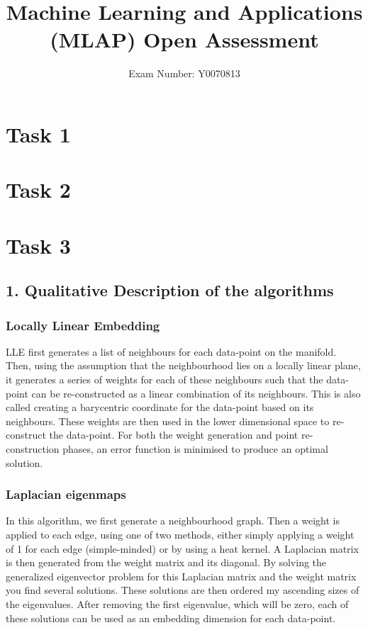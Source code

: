 \documentclass{article}
\begin{document}
	\title{Machine Learning and Applications (MLAP) Open Assessment}
	\author{Exam Number: Y0070813}
	\maketitle
	\section{Task 1}
	\section{Task 2}
	\section{Task 3}
	\subsection{1. Qualitative Description of the algorithms}
		\subsubsection{Locally Linear Embedding}
LLE first generates a list of neighbours for each data-point on the manifold. Then, using the assumption that the neighbourhood lies on a locally linear plane, it generates a series of weights for each of these neighbours such that the data-point can be re-constructed as a linear combination of its neighbours. This is also called creating a barycentric coordinate for the data-point based on its neighbours. These weights are then used in the lower dimensional space to re-construct the data-point. For both the weight generation and point re-construction phases, an error function is minimised to produce an optimal solution.
		\subsubsection{Laplacian eigenmaps}
In this algorithm, we first generate a neighbourhood graph. Then a weight is applied to each edge, using one of two methods, either simply applying a weight of 1 for each edge (simple-minded) or by using a heat kernel. A Laplacian matrix is then generated from the weight matrix and its diagonal. By solving the generalized eigenvector problem for this Laplacian matrix and the weight matrix you find several solutions. These solutions are then ordered my ascending sizes of the eigenvalues. After removing the first eigenvalue, which will be zero, each of these solutions can be used as an embedding dimension for each data-point.
\end{document}
